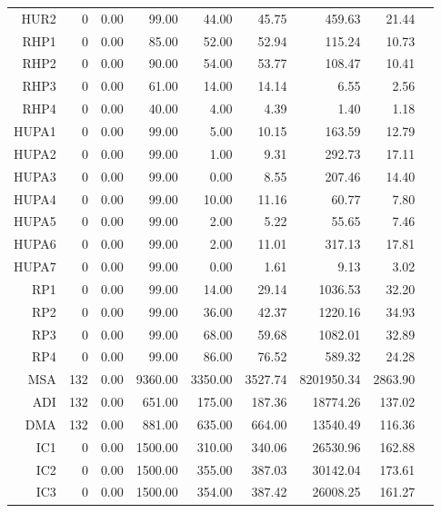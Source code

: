 \begin{longtable}{|rrrrrrrrr|}
	HUR2  &  0  &  0.00  &  99.00  &  44.00  &  45.75  &  459.63  &  21.44 & \\
	RHP1  &  0  &  0.00  &  85.00  &  52.00  &  52.94  &  115.24  &  10.73 & \\
	RHP2  &  0  &  0.00  &  90.00  &  54.00  &  53.77  &  108.47  &  10.41 & \\
	RHP3  &  0  &  0.00  &  61.00  &  14.00  &  14.14  &  6.55  &  2.56 & \\
	RHP4  &  0  &  0.00  &  40.00  &  4.00  &  4.39  &  1.40  &  1.18 & \\
	HUPA1  &  0  &  0.00  &  99.00  &  5.00  &  10.15  &  163.59  &  12.79 & \\
	HUPA2  &  0  &  0.00  &  99.00  &  1.00  &  9.31  &  292.73  &  17.11 & \\
	HUPA3  &  0  &  0.00  &  99.00  &  0.00  &  8.55  &  207.46  &  14.40 & \\
	HUPA4  &  0  &  0.00  &  99.00  &  10.00  &  11.16  &  60.77  &  7.80 & \\
	HUPA5  &  0  &  0.00  &  99.00  &  2.00  &  5.22  &  55.65  &  7.46 & \\
	HUPA6  &  0  &  0.00  &  99.00  &  2.00  &  11.01  &  317.13  &  17.81 & \\
	HUPA7  &  0  &  0.00  &  99.00  &  0.00  &  1.61  &  9.13  &  3.02 & \\
	RP1  &  0  &  0.00  &  99.00  &  14.00  &  29.14  &  1036.53  &  32.20 & \\
	RP2  &  0  &  0.00  &  99.00  &  36.00  &  42.37  &  1220.16  &  34.93 & \\
	RP3  &  0  &  0.00  &  99.00  &  68.00  &  59.68  &  1082.01  &  32.89 & \\
	RP4  &  0  &  0.00  &  99.00  &  86.00  &  76.52  &  589.32  &  24.28 & \\
	MSA  &  132  &  0.00  &  9360.00  &  3350.00  &  3527.74  &  8201950.34  &  2863.90 & \\
	ADI  &  132  &  0.00  &  651.00  &  175.00  &  187.36  &  18774.26  &  137.02 & \\
	DMA  &  132  &  0.00  &  881.00  &  635.00  &  664.00  &  13540.49  &  116.36 & \\
	IC1  &  0  &  0.00  &  1500.00  &  310.00  &  340.06  &  26530.96  &  162.88 & \\
	IC2  &  0  &  0.00  &  1500.00  &  355.00  &  387.03  &  30142.04  &  173.61 & \\
	IC3  &  0  &  0.00  &  1500.00  &  354.00  &  387.42  &  26008.25  &  161.27 & \\

\end{longtable}
